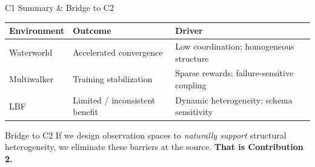 \begin{frame}{C1 Summary \& Bridge to C2}
    \vspace{-0.3em}
    \begin{center}
    \renewcommand{\arraystretch}{1.5}
    \small
    \begin{tabular}{@{} l l l @{}}
        \toprule
        \textbf{Environment} & \textbf{Outcome} & \textbf{Driver} \\
        \midrule
        Waterworld      & Accelerated convergence
            & Low coordination; homogeneous structure \\
        Multiwalker     & Training stabilization
            & Sparse rewards; failure-sensitive coupling \\
        LBF             & Limited / inconsistent benefit
            & Dynamic heterogeneity; schema sensitivity \\
        \bottomrule
    \end{tabular}
    \end{center}

    \vspace{0.5em}
    \begin{alertblock}{Bridge to C2}
        If we design observation spaces to \emph{naturally support}
        structural heterogeneity, we eliminate these barriers at the source.
        \textbf{That is Contribution 2.}
    \end{alertblock}

\end{frame}

